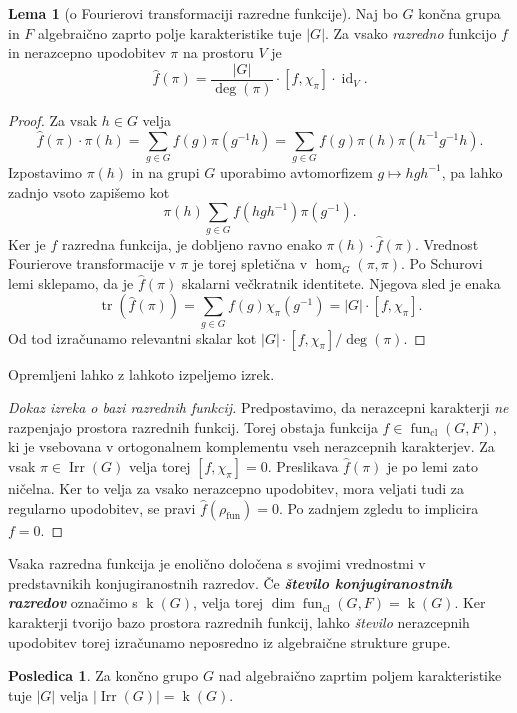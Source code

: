 \documentclass[11pt]{book}
\DeclareMathOperator\tr{tr}
\DeclareMathOperator\Irr{Irr}
\DeclareMathOperator\kk{k}
\DeclareMathOperator\cl{cl}
\DeclareMathOperator\fun{fun}
\DeclareMathOperator\id{id}
\def\definicija{\color{rdeca}\bf\em}
\theoremstyle{definition}
\theoremstyle{zgled}
\theoremstyle{odprtproblem}
\theoremstyle{domacanaloga}
\newenvironment{dokaz}
    {\color{siva}\begin{proof}}
    {\end{proof}}
\theoremstyle{izrek}
\newtheorem*{lema}{Lema}
\newtheorem*{posledica}{Posledica}
\begin{document}
\begin{lema}[o Fourierovi transformaciji razredne funkcije]
Naj bo $G$ končna grupa in $F$ algebraično zaprto polje karakteristike tuje $|G|$. Za vsako \emph{razredno} funkcijo $f$ in nerazcepno upodobitev $\pi$ na prostoru $V$ je 
\[
    \hat{f}(\pi) = 
    \frac{|G|}{\deg(\pi)} \cdot [ f, \chi_{\pi} ] \cdot {\textstyle \id_V}.
\]
\end{lema}
\begin{dokaz}
Za vsak $h \in G$ velja
\[
    \hat{f}(\pi) \cdot \pi(h) =  \sum_{g \in G} f(g) \pi(g^{-1}h)
    =  \sum_{g \in G} f(g) \pi(h) \pi(h^{-1}g^{-1}h).
\]
Izpostavimo $\pi(h)$ in na grupi $G$ uporabimo avtomorfizem $g \mapsto h g h^{-1}$, pa lahko zadnjo vsoto zapišemo kot
\[
    \pi(h)  \sum_{g \in G} f(hgh^{-1}) \pi(g^{-1}).
\]
Ker je $f$ razredna funkcija, je dobljeno ravno enako $\pi(h) \cdot \hat{f}(\pi)$. Vrednost Fourierove transformacije v $\pi$ je torej spletična v $\hom_G(\pi, \pi)$. Po Schurovi lemi sklepamo, da je $\hat{f}(\pi)$ skalarni večkratnik identitete. Njegova sled je enaka
\[
    \tr \left( \hat{f}(\pi) \right) =  \sum_{g \in G} f(g) \chi_{\pi}(g^{-1}) = |G| \cdot [ f, \chi_{\pi} ].
\]
Od tod izračunamo relevantni skalar kot $|G| \cdot [ f, \chi_{\pi} ]/\deg(\pi)$.
\end{dokaz}

Opremljeni lahko z lahkoto izpeljemo izrek.

\begin{dokaz}[Dokaz izreka o bazi razrednih funkcij]
Predpostavimo, da nerazcepni karakterji \emph{ne} razpenjajo prostora razrednih funkcij. Torej obstaja funkcija $f \in \fun_{\cl}(G,F)$, ki je vsebovana v ortogonalnem komplementu vseh nerazcepnih karakterjev. Za vsak $\pi \in \Irr(G)$ velja torej $[ f, \chi_{\pi} ] = 0$. Preslikava $\hat{f}(\pi)$ je po lemi zato ničelna. Ker to velja za vsako nerazcepno upodobitev, mora veljati tudi za regularno upodobitev, se pravi $\hat{f}(\rho_{\fun}) = 0$. Po zadnjem zgledu to implicira $f = 0$. 
\end{dokaz}

Vsaka razredna funkcija je enolično določena s svojimi vrednostmi v predstavnikih konjugiranostnih razredov. Če {\definicija število konjugiranostnih razredov} označimo s $\kk(G)$, velja torej $\dim \fun_{\cl}(G,F) = \kk(G)$. Ker karakterji tvorijo bazo prostora razrednih funkcij, lahko \emph{število} nerazcepnih upodobitev torej izračunamo neposredno iz algebraične strukture grupe.

\begin{posledica}
Za končno grupo $G$ nad algebraično zaprtim poljem karakteristike tuje $|G|$ velja $|\Irr(G)| = \kk(G)$.
\end{posledica}
\end{document}
